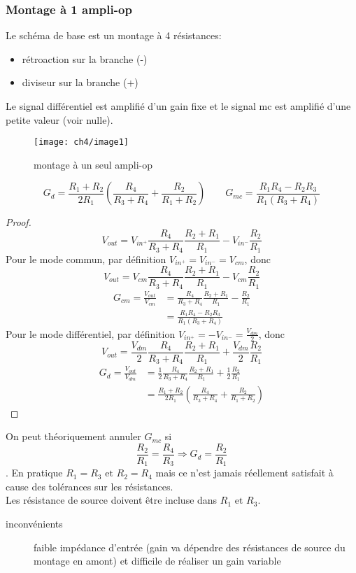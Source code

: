 \subsubsection{Montage à 1 ampli-op}
\begin{minipage}[t]{0.55\textwidth}
	Le schéma de base est un montage à 4 résistances:
	\begin{itemize}
		\item rétroaction sur la branche (-)
		\item diviseur sur la branche (+)
	\end{itemize}
	Le signal différentiel est amplifié d'un gain fixe et le signal mc est amplifié d'une petite valeur (voir nulle).
\end{minipage}
\begin{minipage}[t]{.45\textwidth}
	\vspace{-2cm}
	\begin{figure}[H]
		\centering
		\texttt{[image: ch4/image1]} 
		\caption{montage à un seul ampli-op} 
	\end{figure}
\end{minipage}
\[G_d = \frac{R_1+R_2}{2R_1}\left(\frac{R_4}{R_3+R_4}+\frac{R_2}{R_1+R_2}\right)\qquad G_{mc}=\frac{R_1R_4-R_2R_3}{R_1(R_3+R_4)}\]
\begin{proof}
	\[V_{out} = V_{in^+}\frac{R_4}{R_3+R_4}\frac{R_2+R_1}{R_1}-V_{in^-}\frac{R_2}{R_1}\]
	Pour le mode commun, par définition \(V_{in^+} = V_{in^-} = V_{cm}\), donc
	\[V_{out} = V_{cm}\frac{R_4}{R_3+R_4}\frac{R_2+R_1}{R_1}-V_{cm}\frac{R_2}{R_1}\]
	\begin{align*}
		G_{cm}=\frac{V_{out}}{V_{cm}} &= \frac{R_4}{R_3+R_4}\frac{R_2+R_1}{R_1}-\frac{R_2}{R_1}\\
		&= \frac{R_1R_4-R_2R_3}{R_1(R_3+R_4)}
	\end{align*}
	Pour le mode différentiel, par définition \(V_{in^+} = -V_{in^-}=\frac{V_{dm}}{2}\), donc
	\[V_{out} = \frac{V_{dm}}{2}\frac{R_4}{R_3+R_4}\frac{R_2+R_1}{R_1}+\frac{V_{dm}}{2}\frac{R_2}{R_1}\]
	\begin{align*}
		G_{d} = \frac{V_{out}}{V_{dm}} &= \frac{1}{2}\frac{R_4}{R_3+R_4}\frac{R_2+R_1}{R_1} + \frac{1}{2}\frac{R_2}{R_1}\\
		&= \frac{R_1+R_2}{2R_1}\left(\frac{R_4}{R_3+R_4}+\frac{R_2}{R_1+R_2}\right)
	\end{align*} 
\end{proof}
On peut théoriquement annuler \(G_{mc}\) si \[\frac{R_2}{R_1}=\frac{R_4}{R_3}\Rightarrow G_d=\frac{R_2}{R_1}\]. En pratique \(R_1=R_3\text{ et }R_2=R_4\) mais ce n'est jamais réellement satisfait à cause des tolérances sur les résistances.\\
Les résistance de source doivent être incluse dans \(R_1\text{ et }R_3\).
\begin{description}
	\item[inconvénients] faible impédance d'entrée (gain va dépendre des résistances de source du montage en amont) et difficile de réaliser un gain variable
\end{description}
